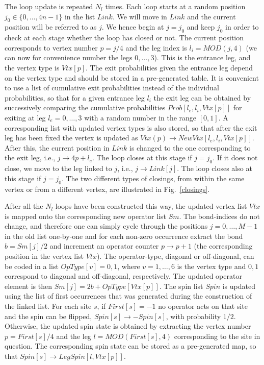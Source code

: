 \documentclass[10pt,pre,aps,twocolumn,showpacs,superscriptaddress,
floatfix]{revtex4}
\begin{document}
The loop update is repeated $N_l$ times. Each loop starts at a random
position $j_0 \in \lbrace 0,\ldots,4n-1\rbrace$ in the list $Link$.
We will move in $Link$ and the current position will be referred
to as $j$. We hence begin at $j=j_0$ and keep $j_0$ in order to check at 
each stage whether the loop has closed or not. The current position 
corresponds to vertex number $p=j/4$ and the leg index is $l_i=MOD(j,4)$ 
(we can now for convenience number the legs $0,\ldots,3$). This 
is the entrance leg, and the vertex type is $Vtx[p]$.  The exit probabilities  
given the entrance leg depend on the vertex type and should be stored in a 
pre-generated table. It is convenient to use a list of cumulative exit 
probabilities instead of the individual probabilities, so that for a given 
entrance leg $l_i$ the exit leg can be obtained by successively comparing the 
cumulative probabilities $Prob[l_e,l_i,Vtx[p]]$ for exiting at leg 
$l_e=0,\ldots,3$ with a random number in the range $[0,1]$. A corresponding 
list with updated vertex types is also stored, so that after the exit leg 
has been fixed the vertex is updated as $Vtx(p) \to NewVtx[l_e,l_i,Vtx[p]]$. 
After this, the current position in $Link$ is changed to the one corresponding 
to the exit leg, i.e., $j \to 4p+l_e$. The loop closes at this stage if 
$j=j_0$. If it does not close, we move to the leg linked to $j$, i.e., 
$j \to Link[j]$. The loop closes also at this stage if $j=j_0$. The two 
different types of closings, from within the same vertex or from a different 
vertex, are illustrated in Fig.~\ref{closings}.

After all the $N_l$ loops have been constructed this way, the updated
vertex list $Vtx$ is mapped onto the corresponding new operator list
$Sm$. The bond-indices do not change, and therefore one can simply cycle 
through the positions $j=0,\ldots,M-1$ in the old list one-by-one and for each 
non-zero occurrence extract the bond $b=Sm[j]/2$ and increment an operator 
counter $p \to p+1$ (the corresponding position in the vertex list $Vtx$). 
The operator-type, diagonal or off-diagonal, can be coded in a list
$OpType[v]=0,1$, where $v=1,\ldots ,6$ is the vertex type and $0,1$ 
correspond to diagonal and off-diagonal, respectively. The updated operator 
element is then $Sm[j]=2b+OpType[Vtx[p]]$. The spin list $Spin$ is updated 
using the list of first occurrences that was generated during the construction
of the linked list. For each site $s$, if $First[s]=-1$ no
operator acts on that site and the spin can be flipped, $Spin[s] \to
-Spin[s]$, with probability $1/2$. Otherwise, the updated spin state
is obtained by extracting the vertex number $p=First[s]/4$ and the leg
$l=MOD(First[s],4)$ corresponding to the site in question. The corresponding 
spin state can be stored as a pre-generated map, so that
$Spin[s] \to LegSpin[l,Vtx[p]]$.
\end{document}
